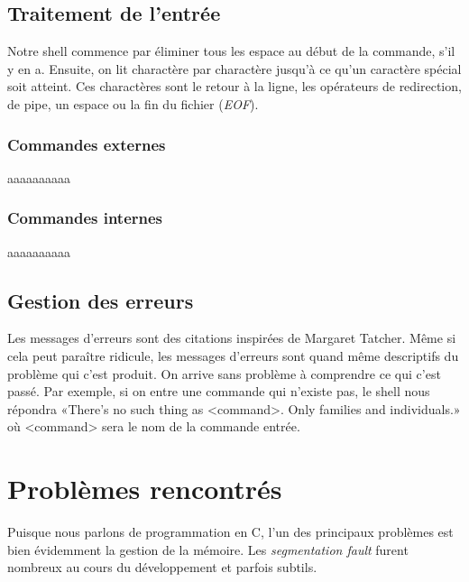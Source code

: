 \documentclass[letterpaper,12pt]{scrartcl}
\begin{document}
		\subsection{Traitement de l'entrée}
			Notre shell commence par éliminer tous les espace au début de la commande, s'il y en a. Ensuite, on lit charactère par charactère jusqu'à ce qu'un caractère spécial soit atteint. Ces charactères sont le retour à la ligne, les opérateurs de redirection, de pipe, un espace ou la fin du fichier (\textit{EOF}).
			
			\subsubsection{Commandes externes}
			aaaaaaaaaa
			\subsubsection{Commandes internes}
			aaaaaaaaaa
		\subsection{Gestion des erreurs}
			Les messages d'erreurs sont des citations inspirées de Margaret Tatcher. Même si cela peut paraître ridicule, les messages
		d'erreurs sont quand même descriptifs du problème qui c'est produit. On arrive sans problème à comprendre ce qui c'est passé. Par exemple, si on entre une commande qui n'existe pas, le shell nous répondra «There's no such thing as <command>. Only families and individuals.» où <command> sera le nom de la commande entrée.
	\section{Problèmes rencontrés}
		Puisque nous parlons de programmation en C, l'un des principaux problèmes est bien évidemment la gestion de la mémoire. Les \textit{segmentation fault} furent nombreux au cours du développement et parfois subtils.
\end{document}
